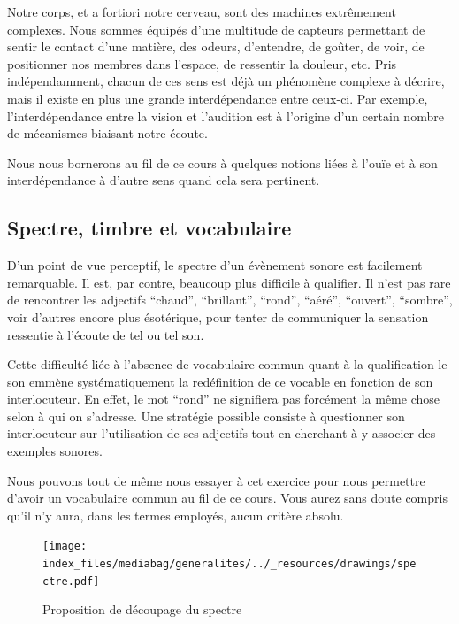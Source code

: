 \documentclass[
  letterpaper,
  DIV=11,
  numbers=noendperiod]{scrreprt}
\begin{document}
Notre corps, et a fortiori notre cerveau, sont des machines extrêmement
complexes. Nous sommes équipés d'une multitude de capteurs permettant de
sentir le contact d'une matière, des odeurs, d'entendre, de goûter, de
voir, de positionner nos membres dans l'espace, de ressentir la douleur,
etc. Pris indépendamment, chacun de ces sens est déjà un phénomène
complexe à décrire, mais il existe en plus une grande interdépendance
entre ceux-ci. Par exemple, l'interdépendance entre la vision et
l'audition est à l'origine d'un certain nombre de mécanismes biaisant
notre écoute.

Nous nous bornerons au fil de ce cours à quelques notions liées à l'ouïe
et à son interdépendance à d'autre sens quand cela sera pertinent.

\hypertarget{spectre-timbre-et-vocabulaire}{%
\subsection{Spectre, timbre et
vocabulaire}\label{spectre-timbre-et-vocabulaire}}

D'un point de vue perceptif, le spectre d'un évènement sonore est
facilement remarquable. Il est, par contre, beaucoup plus difficile à
qualifier. Il n'est pas rare de rencontrer les adjectifs ``chaud'',
``brillant'', ``rond'', ``aéré'', ``ouvert'', ``sombre'', voir d'autres
encore plus ésotérique, pour tenter de communiquer la sensation
ressentie à l'écoute de tel ou tel son.

Cette difficulté liée à l'absence de vocabulaire commun quant à la
qualification le son emmène systématiquement la redéfinition de ce
vocable en fonction de son interlocuteur. En effet, le mot ``rond'' ne
signifiera pas forcément la même chose selon à qui on s'adresse. Une
stratégie possible consiste à questionner son interlocuteur sur
l'utilisation de ses adjectifs tout en cherchant à y associer des
exemples sonores.

Nous pouvons tout de même nous essayer à cet exercice pour nous
permettre d'avoir un vocabulaire commun au fil de ce cours. Vous aurez
sans doute compris qu'il n'y aura, dans les termes employés, aucun
critère absolu.

\begin{figure}

{\centering \texttt{[image: index\_files/mediabag/generalites/../\_resources/drawings/spectre.pdf]}

}

\caption{\label{fig-spectre}Proposition de découpage du spectre}

\end{figure}
\end{document}
